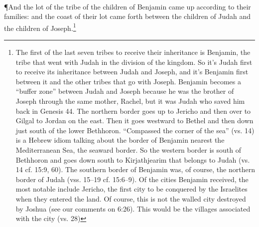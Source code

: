 \\
\P \textcolor[rgb]{0.00,0.00,1.00}{And the lot of the tribe of the children of Benjamin came up according to their families: and the coast of their lot came forth between the children of Judah and the children of Joseph.}\footnote{The first of the last seven tribes to receive
their inheritance is Benjamin, the tribe that went
with Judah in the division of the kingdom. So
it’s Judah first to receive its inheritance between
Judah and Joseph, and it’s Benjamin first
between it and the other tribes that go with
Joseph. Benjamin becomes a “buffer zone”
between Judah and Joseph because he was the
brother of Joseph through the same mother,
Rachel, but it was Judah who saved him back in
Genesis 44.
The northern border goes up to Jericho and
then over to Gilgal to Jordan on the east. Then
it goes westward to Bethel and then down just
south of the lower Bethhoron. “Compassed
the corner of the sea” (vs. 14) is a Hebrew
idiom talking about the border of Benjamin
nearest the Mediterranean Sea, the seaward
border. So the western border is south of
Bethhoron and goes down south to
Kirjathjearim that belongs to Judah (vs. 14 cf.
15:9, 60). The southern border of Benjamin
was, of course, the northern border of Judah
(vss. 15–19 cf. 15:6–9).
Of the cities Benjamin received, the most
notable include Jericho, the first city to be
conquered by the Israelites when they entered
the land. Of course, this is not the walled city
destroyed by Joshua (see our comments on
6:26). This would be the villages associated
with the city (vs. 28)}
